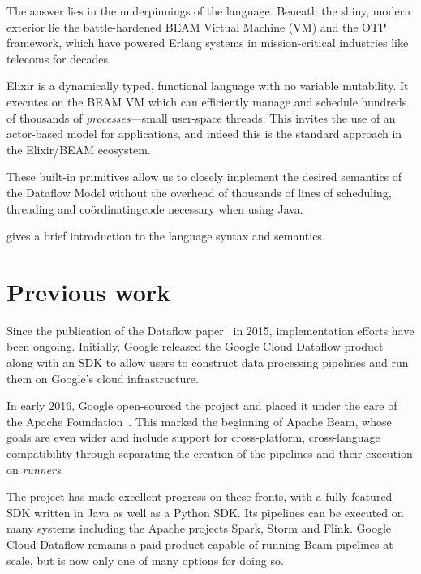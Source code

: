The answer lies in the underpinnings of the language.
Beneath the shiny, modern exterior lie the battle-hardened BEAM Virtual Machine (VM) and the OTP framework, which have powered Erlang systems in mission-critical industries like telecoms for decades.

Elixir is a dynamically typed, functional language with no variable mutability. 
It executes on the BEAM VM which can efficiently manage and schedule hundreds of thousands of \emph{processes}---small user-space threads.
This invites the use of an actor-based model for applications, and indeed this is the standard approach in the Elixir/BEAM ecosystem.

These built-in primitives allow us to closely implement the desired semantics of the Dataflow Model without the overhead of thousands of lines of scheduling, threading and co\"ordinating\footnotemark[1] code necessary when using Java.


 gives a brief introduction to the language syntax and semantics.

\section{Previous work}\label{sec:intro:previous}
Since the publication of the Dataflow paper~\cite{Akidau:2015} in 2015, implementation efforts have been ongoing.
Initially, Google released the Google Cloud Dataflow product~\cite{CloudDataflow} along with an SDK to allow users to construct data processing pipelines and run them on Google's cloud infrastructure.

In early 2016, Google open-sourced the project and placed it under the care of the Apache Foundation~\cite{ApacheDataflowPost}.
This marked the beginning of Apache Beam, whose goals are even wider and include support for cross-platform, cross-language compatibility through separating the creation of the pipelines and their execution on \emph{runners}.

The project has made excellent progress on these fronts, with a fully-featured SDK written in Java as well as a Python SDK.
Its pipelines can be executed on many systems including the Apache projects Spark, Storm and Flink.
Google Cloud Dataflow remains a paid product capable of running Beam pipelines at scale, but is now only one of many options for doing so.

